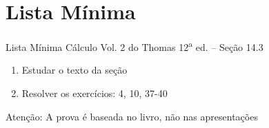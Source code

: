 \section{Lista Mínima}

\begin{frame}{Lista Mínima}
  Cálculo Vol. 2 do Thomas 12\textsuperscript{a} ed. -- Seção 14.3
  \begin{enumerate}
    \item Estudar o texto da seção
    \item Resolver os exercícios: 4, 10, 37-40
  \end{enumerate}

  \vfill
  Atenção: A prova é baseada no livro, não nas apresentações
\end{frame}


